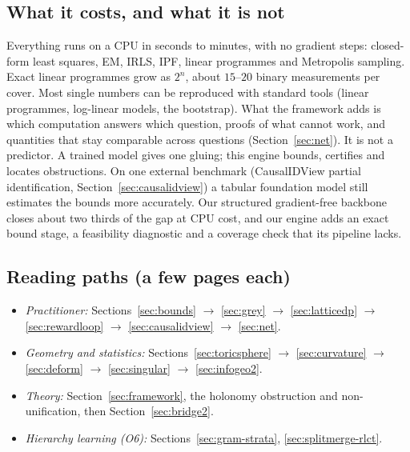 \documentclass[11pt]{article}
\theoremstyle{definition}
\theoremstyle{remark}
\begin{document}
\subsection*{What it costs, and what it is not}
Everything runs on a CPU in seconds to minutes, with no gradient steps: closed-form least squares, EM, IRLS, IPF, linear programmes and Metropolis sampling. Exact linear programmes grow as $2^n$, about $15$--$20$ binary measurements per cover. Most single numbers can be reproduced with standard tools (linear programmes, log-linear models, the bootstrap). What the framework adds is which computation answers which question, proofs of what cannot work, and quantities that stay comparable across questions (Section~\ref{sec:net}). It is not a predictor. A trained model gives one gluing; this engine bounds, certifies and locates obstructions. On one external benchmark (CausalIDView partial identification, Section~\ref{sec:causalidview}) a tabular foundation model still estimates the bounds more accurately. Our structured gradient-free backbone closes about two thirds of the gap at CPU cost, and our engine adds an exact bound stage, a feasibility diagnostic and a coverage check that its pipeline lacks.

\subsection*{Reading paths (a few pages each)}
\begin{itemize}
  \item \emph{Practitioner:} Sections~\ref{sec:bounds} $\to$ \ref{sec:grey} $\to$ \ref{sec:latticedp} $\to$ \ref{sec:rewardloop} $\to$ \ref{sec:causalidview} $\to$ \ref{sec:net}.
  \item \emph{Geometry and statistics:} Sections~\ref{sec:toricsphere} $\to$ \ref{sec:curvature} $\to$ \ref{sec:deform} $\to$ \ref{sec:singular} $\to$ \ref{sec:infogeo2}.
  \item \emph{Theory:} Section~\ref{sec:framework}, the holonomy obstruction and non-unification, then Section~\ref{sec:bridge2}.
  \item \emph{Hierarchy learning (O6):} Sections~\ref{sec:gram-strata}, \ref{sec:splitmerge-rlct}.
\end{itemize}
\newpage


\end{document}
